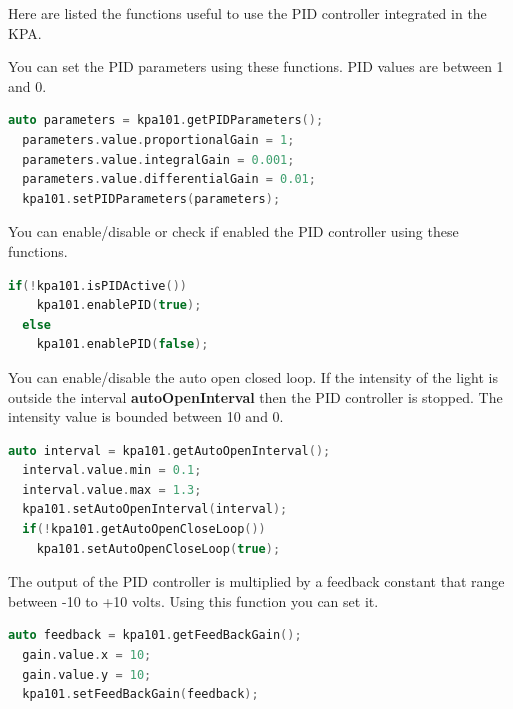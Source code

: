 Here are listed the functions useful to use the PID controller
integrated in the KPA.

You can set the PID parameters using these functions. PID values are
between 1 and 0.

\begin{lstlisting}[language=c++, gobble=2]
  auto parameters = kpa101.getPIDParameters();
  parameters.value.proportionalGain = 1;
  parameters.value.integralGain = 0.001;
  parameters.value.differentialGain = 0.01;
  kpa101.setPIDParameters(parameters);
\end{lstlisting}

You can enable/disable or check if enabled the PID controller using
these functions.

\begin{lstlisting}[language=c++, gobble=2]
  if(!kpa101.isPIDActive())
    kpa101.enablePID(true);
  else
    kpa101.enablePID(false);
\end{lstlisting}

You can enable/disable the auto open closed loop. If the intensity of
the light is outside the interval \textbf{autoOpenInterval} then the PID
controller is stopped. The intensity value is bounded between 10 and 0.

\begin{lstlisting}[language=c++, gobble=2]
  auto interval = kpa101.getAutoOpenInterval();
  interval.value.min = 0.1;
  interval.value.max = 1.3;
  kpa101.setAutoOpenInterval(interval);
  if(!kpa101.getAutoOpenCloseLoop())
    kpa101.setAutoOpenCloseLoop(true);
\end{lstlisting}

The output of the PID controller is multiplied by a feedback constant
that range between -10 to +10 volts. Using this function you can set
it.

\begin{lstlisting}[language=c++, gobble=2]
  auto feedback = kpa101.getFeedBackGain();
  gain.value.x = 10;
  gain.value.y = 10;
  kpa101.setFeedBackGain(feedback);
\end{lstlisting}